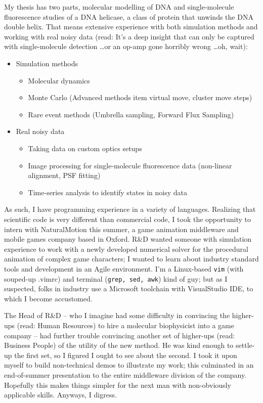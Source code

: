 \documentclass{../res}
\begin{document}
\begin{sloppypar}
\begin{resume}
My thesis has two parts, molecular modelling of DNA and single-molecule fluorescence studies of a DNA helicase, a class of protein that unwinds the DNA double helix. That means extensive experience with both simulation methods and working with real noisy data (read: It's a deep insight that can only be captured with single-molecule detection \ldots or an op-amp gone horribly wrong \ldots oh, wait):
\begin{itemize}[itemindent=1cm]
    \item Simulation methods
        \begin{itemize}[itemindent=1cm]
            \item Molecular dynamics
            \item Monte Carlo (Advanced methods item virtual move, cluster move steps)
            \item Rare event methods (Umbrella sampling, Forward Flux Sampling)
        \end{itemize}
    \item Real noisy data
        \begin{itemize}[itemindent=1cm]
            \item Taking data on custom optics setups
            \item Image processing for single-molecule fluorescence data (non-linear alignment, PSF fitting)
            \item Time-series analysis to identify states in noisy data
        \end{itemize}
\end{itemize}

As such, I have programming experience in a variety of languages. Realizing that scientific code is very different than commercial code, I took the opportunity to intern with NaturalMotion this summer, a game animation middleware and mobile games company based in Oxford. R\&D wanted someone with simulation experience to work with a newly developed numerical solver for the procedural animation of complex game characters; I wanted to learn about industry standard tools and development in an Agile environment. I'm a Linux-based \texttt{vim} (with souped-up .vimrc) and terminal (\texttt{grep, sed, awk}) kind of guy; but as I suspected, folks in industry use a Microsoft toolchain with VisualStudio IDE, to which I become accustomed.

The Head of R\&D -- who I imagine had some difficulty in convincing the higher-ups (read: Human Resources) to hire a molecular biophysicist into a game company -- had further trouble convincing another set of higher-ups (read: Business People) of the utility of the new method. He was kind enough to settle-up the first set, so I figured I ought to see about the second. I took it upon myself to build non-technical demos to illustrate my work; this culminated in an end-of-summer presentation to the entire middleware division of the company. Hopefully this makes things simpler for the next man with non-obviously applicable skills. Anyways, I digress.


\end{resume}
\end{sloppypar}
\end{document}
